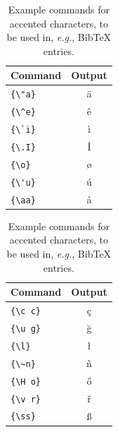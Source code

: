 \documentclass[11pt]{article}
\begin{document}
\begin{table}
    \centering
    \begin{tabular}{lc}
        \hline
        \textbf{Command} & \textbf{Output} \\
        \hline
        \verb|{\"a}|     & {\"a}           \\
        \verb|{\^e}|     & {\^e}           \\
        \verb|{\`i}|     & {\`i}           \\
        \verb|{\.I}|     & {\.I}           \\
        \verb|{\o}|      & {\o}            \\
        \verb|{\'u}|     & {\'u}           \\
        \verb|{\aa}|     & {\aa}           \\\hline
    \end{tabular}
    \begin{tabular}{lc}
        \hline
        \textbf{Command} & \textbf{Output} \\
        \hline
        \verb|{\c c}|    & {\c c}          \\
        \verb|{\u g}|    & {\u g}          \\
        \verb|{\l}|      & {\l}            \\
        \verb|{\~n}|     & {\~n}           \\
        \verb|{\H o}|    & {\H o}          \\
        \verb|{\v r}|    & {\v r}          \\
        \verb|{\ss}|     & {\ss}           \\
        \hline
    \end{tabular}
    \caption{Example commands for accented characters, to be used in, \emph{e.g.}, Bib\TeX{} entries.}
    \label{tab:accents}
\end{table}
\end{document}
